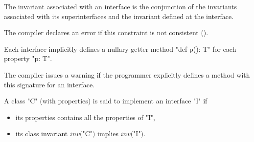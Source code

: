 \fi

\noindent
The invariant associated with an interface is the conjunction of the
invariants associated with its superinterfaces and the invariant
defined at the interface. 


\begin{staticrule*}
   The compiler declares an error if this constraint
   is not consistent ().  
\end{staticrule*}

Each interface implicitly defines a nullary getter method
\xcd"def p(): T" for each property \xcd"p: T". 

\begin{staticrule*}
   The compiler issues a warning if the programmer
   explicitly defines a method with this signature for an interface.
\end{staticrule*}

A class \xcd"C" (with properties) is said to implement an interface \xcd"I" if
\begin{itemize}
  \item its properties contains all the properties of \xcd"I",
\item its class invariant
$\mathit{inv}($\xcd"C"$)$ implies
$\mathit{inv}($\xcd"I"$)$.
\end{itemize}

